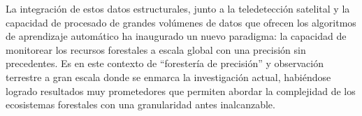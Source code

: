 La integración de estos datos estructurales, junto a la teledetección satelital y la capacidad de procesado de grandes volúmenes de datos que ofrecen los algoritmos de aprendizaje automático ha inaugurado un nuevo paradigma: la capacidad de monitorear los recursos forestales a escala global con una precisión sin precedentes. Es en este contexto de ``forestería de precisión'' y observación terrestre a gran escala donde se enmarca la investigación actual, habiéndose logrado resultados muy prometedores que permiten abordar la complejidad de los ecosistemas forestales con una granularidad antes inalcanzable.

